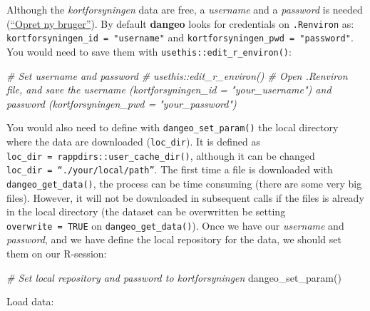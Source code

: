 \documentclass[
  12pt,
]{article}
\newenvironment{Shaded}{\begin{snugshade}}{\end{snugshade}}
\newcommand{\CommentTok}[1]{\textcolor[rgb]{0.56,0.35,0.01}{\textit{#1}}}
\newcommand{\FunctionTok}[1]{\textcolor[rgb]{0.00,0.00,0.00}{#1}}
\newcommand{\NormalTok}[1]{#1}
\begin{document}
Although the \emph{kortforsyningen} data are free, a \emph{username} and
a \emph{password} is needed
(\href{https://kortforsyningen.dk/indhold/min-side-0}{``Opret ny
bruger''}). By default \textbf{dangeo} looks for credentials on
\texttt{.Renviron} as: \texttt{kortforsyningen\_id\ =\ "username"} and
\texttt{kortforsyningen\_pwd\ =\ "password"}. You would need to save
them with \texttt{usethis::edit\_r\_environ()}:

\begin{Shaded}
\begin{Highlighting}[]
\CommentTok{\# Set username and password }
\CommentTok{\# usethis::edit\_r\_environ() \# Open .Renviron file, and save the username (kortforsyningen\_id = "your\_username") and password (kortforsyningen\_pwd = "your\_password")}
\end{Highlighting}
\end{Shaded}

You would also need to define with \texttt{dangeo\_set\_param()} the
local directory where the data are downloaded (\texttt{loc\_dir}). It is
defined as \texttt{loc\_dir\ =\ rappdirs::user\_cache\_dir()}, although
it can be changed \texttt{loc\_dir\ =\ “./your/local/path”}. The first
time a file is downloaded with \texttt{dangeo\_get\_data()}, the process
can be time consuming (there are some very big files). However, it will
not be downloaded in subsequent calls if the files is already in the
local directory (the dataset can be overwritten be setting
\texttt{overwrite\ =\ TRUE} on \texttt{dangeo\_get\_data()}). Once we
have our \emph{username} and \emph{password}, and we have define the
local repository for the data, we should set them on our R-session:

\begin{Shaded}
\begin{Highlighting}[]
\CommentTok{\# Set local repository and password to kortforsyningen}
\FunctionTok{dangeo\_set\_param}\NormalTok{()}
\end{Highlighting}
\end{Shaded}

Load data:
\end{document}
